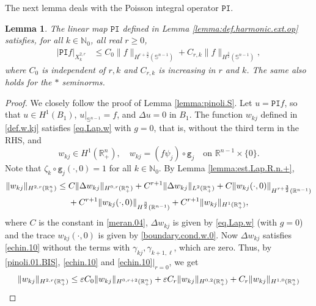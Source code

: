 \documentclass[10pt,reqno,a4paper]{article}
\numberwithin{equation}{section}
\theoremstyle{plain}
\newtheorem{lemma}[theorem]{Lemma}
\theoremstyle{definition}
\newcommand{\N}{{\mathbb N}}
\newcommand{\R}{{\mathbb R}}
\renewcommand{\S}{{\mathbb S}}
\newcommand{\e}{\varepsilon}
\begin{document}
The next lemma deals with the Poisson integral operator $\mathtt{PI}$. 

\begin{lemma} \label{lemma:pinoli.u.0}
The linear map $\mathtt{PI}$ defined in Lemma \ref{lemma:def.harmonic.ext.op} 
satisfies, for all $k \in \N_0$, all real $r \geq 0$, 
\begin{align} 
| \mathtt{PI} f |_{X^{2,r}_k} 
& \leq C_0 \| f \|_{H^{r+\frac32}(\S^{n-1})}
+ C_{r,k} \| f \|_{H^{\frac32}(\S^{n-1})},
\label{pinoli.interpol.psi}
\end{align}
where $C_0$ is independent of $r,k$ 
and $C_{r,k}$ is increasing in $r$ and $k$.
The same also holds for the $*$ seminorms. 
\end{lemma}


\begin{proof}
We closely follow the proof of Lemma \ref{lemma:pinoli.S}. 
Let $u = \mathtt{PI} f$, so that $u \in H^1(B_1)$, $u|_{\S^{n-1}} = f$, and $\Delta u = 0$ in $B_1$. 
The function $w_{kj}$ defined in \eqref{def.w.kj} 
satisfies \eqref{eq.Lap.w} with $g = 0$, 
that is, without the third term in the RHS, 
and 
\begin{equation} \label{boundary.cond.w.0}
w_{kj} \in H^1(\R^n_+), \quad 
w_{kj} = (f \psi_j) \circ \mathtt g_j \quad \text{on } \R^{n-1} \times \{ 0 \}.
\end{equation}
Note that $\zeta_k \circ \mathtt g_j (\cdot, 0) = 1$ for all $k \in \N_0$. 
By Lemma \ref{lemma:est.Lap.R.n.+}, 
\begin{align} 
\| w_{kj} \|_{H^{2,r}(\R^n_+)} 
& \leq C \| \Delta w_{kj} \|_{H^{0,r}(\R^n_+)} 
+ C^{r+1} \| \Delta w_{kj} \|_{L^2(\R^n_+)} 
+ C \| w_{kj}(\cdot, 0) \|_{H^{r + \frac32}(\R^{n-1})}
\notag \\ & \quad \ 
+ C^{r+1} \| w_{kj}(\cdot, 0) \|_{H^{\frac32}(\R^{n-1})}
+ C^{r+1} \| w_{kj} \|_{H^1(\R^n_+)}, 
\label{pinoli.01.BIS}
\end{align}
where $C$ is the constant in \eqref{meran.04},
$\Delta w_{kj}$ is given by \eqref{eq.Lap.w} (with $g = 0$) 
and the trace $w_{kj}(\cdot, 0)$ is given by \eqref{boundary.cond.w.0}.
Now $\Delta w_{kj}$ satisfies \eqref{echin.10} without the terms with 
$\gamma_{kj}, \gamma_{k+1,\ell}$, which are zero. 
Thus, by \eqref{pinoli.01.BIS}, \eqref{echin.10} and \eqref{echin.10}$|_{r=0}$, we get
\begin{align}
\| w_{kj} \|_{H^{2,r}(\R^n_+)}
& \leq \e C_0 \| w_{kj} \|_{H^{0, r+2}(\R^n_+)} 
+ \e C_r \| w_{kj} \|_{H^{0, 2}(\R^n_+)}
+ C_r \| w_{kj} \|_{H^{1,0}(\R^n_+)}
\notag \\ 

\end{align}
\end{proof}
\end{document}
